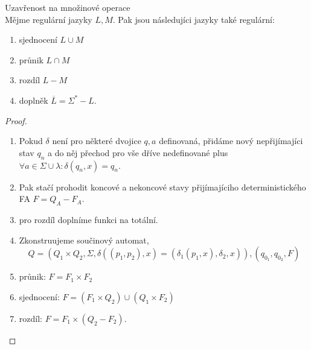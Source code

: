 \documentclass[../main.tex]{subfiles}
\begin{document}
\begin{theorem}
    Uzavřenost na množinové operace\\

    Mějme regulární jazyky $L,M$. Pak jsou následujíci jazyky také regulární:
    \begin{enumerate}
        \item sjednocení $L\cup M$
        \item průnik $L \cap M$
        \item rozdíl $L - M$
        \item doplněk $\overline{L} = \Sigma^* - L$.
    \end{enumerate} 
\end{theorem}
\begin{proof}
    \begin{enumerate}
        \item Pokud $\delta$ není pro některé dvojice $q,a$ definovaná, přidáme nový nepřijímajíci stav $q_n$ a do něj
        přechod pro vše dříve nedefinované plus $\forall a \in \Sigma \cup {\lambda}: \delta(q_n,x) = q_n$.
        \item Pak stačí prohodit koncové a nekoncové stavy přijímajíciho deterministického FA $F = Q_A - F_A$.
        \item pro rozdíl doplníme funkci \delta na totální.
        \item Zkonstruujeme součinový automat,
        \[Q = (Q_1 \times Q_2, \Sigma, \delta((p_1,p_2),x) = (\delta_1(p_1,x),\delta_2,x)), (q_{0_1},q_{0_2},F) \]
        \item průnik: $F = F_1 \times F_2$
        \item sjednocení: $F = (F_1 \times Q_2) \cup (Q_1 \times F_2)$
        \item rozdíl: $F = F_1 \times (Q_2 - F_2)$. 
    \end{enumerate}
\end{proof}
\end{document}
